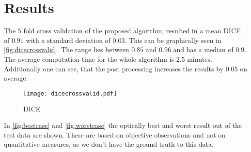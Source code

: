 \section{Results}
The 5 fold cross validation of the proposed algorithm, resulted in a mean DICE of $0.91$ with a standard deviation of $0.03$. This can be graphically seen in \autoref{fig:dicecrossvalid}. The range lies between $0.85$ and $0.96$ and has a median of $0.9$. The average computation time for the whole algorithm is $2.5$ minutes. Additionally one can see, that the post processing increases the results by $0.05$ on average.
\begin{figure}[h]
\centering
\texttt{[image: dicecrossvalid.pdf]}
\caption{DICE}
\label{fig:dicecrossvalid}
\end{figure}

In \autoref{fig:bestcase} and \autoref{fig:worstcase} the optically best and worst result out of the test data are shown. These are based on objective observations and not on quantitative measures, as we don't have the ground truth to this data.
\begin{figure*}[!t]
	\centering
	\hfil
\end{figure*}
